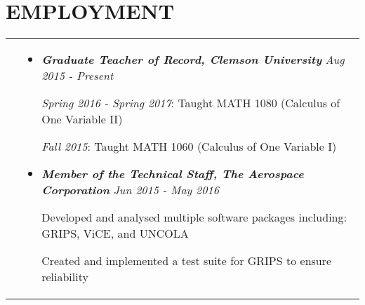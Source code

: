 \documentclass[10pt]{article}
\begin{document}
\section{\textbf{EMPLOYMENT}}
\vspace*{-\baselineskip}
\hskip-1.7in
\begin{tabularx}{1.5\linewidth}{>{\raggedleft\scshape}p{3cm}X}

  &\begin{itemize}
    \setlength\itemsep{.005em}

               
                   \setlength\itemsep{.005em}
  \item \textbf{\textit{Graduate Teacher of Record, 
  Clemson University}}    \hspace{34 mm}\textit{Aug 2015 - Present}
  
\textit{Spring 2016 - Spring 2017}: Taught MATH 1080 (Calculus of One Variable II)

\textit{Fall 2015}: Taught MATH 1060 (Calculus of One Variable I)

  \item \textbf{\textit{Member of the Technical Staff, The Aerospace Corporation}}    \hspace{17 mm}\textit{Jun 2015 - May 2016}
  
Developed and analysed multiple software packages including: GRIPS, ViCE, and UNCOLA

Created and implemented a test suite for GRIPS to ensure reliability
  \end{itemize} 

\end{tabularx}
\end{document}
